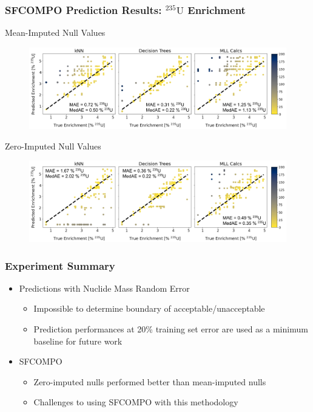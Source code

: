 \begin{frame}
  \frametitle{SFCOMPO Prediction Results: ${}^{235}\text{U}$ Enrichment}
  \vspace{-5pt}
  \begin{block}{Mean-Imputed Null Values}
    \begin{figure}
      \centering
      \includegraphics[height=0.35\textheight]{./figures/sfcompo_truey_vs_predy_impnull__enri.png}
    \end{figure}
  \end{block}
  \vspace{-5pt}
  \begin{block}{Zero-Imputed Null Values}
    \begin{figure}
      \centering
      \includegraphics[height=0.35\textheight]{./figures/sfcompo_truey_vs_predy_0null__enri.png}
    \end{figure}
  \end{block}
\end{frame}

\begin{frame}
  \frametitle{Experiment Summary}
  \begin{itemize}
  \item Predictions with Nuclide Mass Random Error
    \begin{itemize}
      \item Impossible to determine boundary of acceptable/unacceptable
      \item Prediction performances at 20\% training set error are used as a
      minimum baseline for future work 
    \end{itemize}
  \item SFCOMPO
    \begin{itemize}
      \item Zero-imputed nulls performed better than mean-imputed nulls
      \item Challenges to using SFCOMPO with this methodology
    \end{itemize}
  \end{itemize}
\end{frame}

